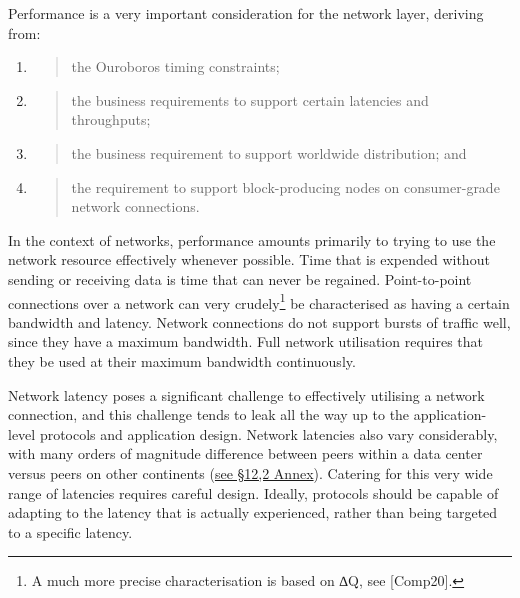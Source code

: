 \documentclass[11pt,a4paper]{article}
\begin{document}
Performance is a very important consideration for the network layer,
deriving from:

\begin{enumerate}
\def\labelenumi{\arabic{enumi}.}
\item
  \begin{quote}
  the Ouroboros timing constraints;
  \end{quote}
\item
  \begin{quote}
  the business requirements to support certain latencies and
  throughputs;
  \end{quote}
\item
  \begin{quote}
  the business requirement to support worldwide distribution; and
  \end{quote}
\item
  \begin{quote}
  the requirement to support block-producing nodes on consumer-grade
  network connections.
  \end{quote}
\end{enumerate}

In the context of networks, performance amounts primarily to trying to
use the network resource effectively whenever possible. Time that is
expended without sending or receiving data is time that can never be
regained. Point-to-point connections over a network can very
crudely\footnote{A much more precise characterisation is based on ∆Q,
  see {[}Comp20{]}.} be characterised as having a certain bandwidth and
latency. Network connections do not support bursts of traffic well,
since they have a maximum bandwidth. Full network utilisation requires
that they be used at their maximum bandwidth continuously.

Network latency poses a significant challenge to effectively utilising a
network connection, and this challenge tends to leak all the way up to
the application-level protocols and application design. Network
latencies also vary considerably, with many orders of magnitude
difference between peers within a data center versus peers on other
continents (\protect\hyperlink{tcp-rpc-response-behavior}{{see §12,2
Annex}}). Catering for this very wide range of latencies requires
careful design. Ideally, protocols should be capable of adapting to the
latency that is actually experienced, rather than being targeted to a
specific latency.
\end{document}
